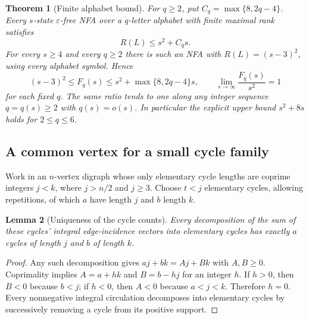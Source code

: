 \documentclass[11pt,letterpaper]{article}
\newtheorem{theorem}{Theorem}[section]
\newtheorem{lemma}[theorem]{Lemma}
\theoremstyle{definition}
\theoremstyle{remark}
\begin{document}
\begin{theorem}[Finite alphabet bound]\label{ccc:sc:thm:alphabet}
For $q\ge2$, put $C_q=\max\{8,2q-4\}$. Every $s$-state $\varepsilon$-free NFA over a $q$-letter alphabet with finite maximal rank satisfies
\[
 \boxed{R(L)\le s^2+C_qs.}
\]
For every $s\ge4$ and every $q\ge2$ there is such an NFA with $R(L)=(s-3)^2$, using every alphabet symbol. Hence
\[
 (s-3)^2\le F_q(s)\le s^2+\max\{8,2q-4\}s,
 \qquad \lim_{s\to\infty}\frac{F_q(s)}{s^2}=1
\]
for each fixed $q$. The same ratio tends to one along any integer sequence $q=q(s)\ge2$ with $q(s)=o(s)$. In particular the explicit upper bound $s^2+8s$ holds for $2\le q\le6$.
\end{theorem}

\subsection{A common vertex for a small cycle family}

Work in an $n$-vertex digraph whose only elementary cycle lengths are coprime integers $j<k$, where $j>n/2$ and $j\ge3$. Choose $t<j$ elementary cycles, allowing repetitions, of which $a$ have length $j$ and $b$ length $k$.

\begin{lemma}[Uniqueness of the cycle counts]\label{ccc:sc:lem:counts}
Every decomposition of the sum of these cycles' integral edge-incidence vectors into elementary cycles has exactly $a$ cycles of length $j$ and $b$ of length $k$.
\end{lemma}
\begin{proof}
Any such decomposition gives $aj+bk=Aj+Bk$ with $A,B\ge0$. Coprimality implies $A=a+hk$ and $B=b-hj$ for an integer $h$. If $h>0$, then $B<0$ because $b<j$; if $h<0$, then $A<0$ because $a<j<k$. Therefore $h=0$. Every nonnegative integral circulation decomposes into elementary cycles by successively removing a cycle from its positive support.
\end{proof}
\end{document}
